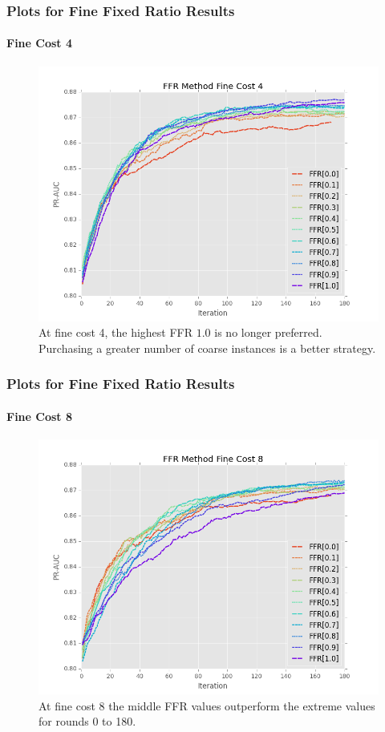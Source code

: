 \documentclass{beamer}
\begin{document}
\begin{frame}
    \frametitle{Plots for Fine Fixed Ratio Results}
    \framesubtitle{Fine Cost 4}
    \begin{figure}[!htb]
        \centering
        \includegraphics[width=0.8\columnwidth]{fig/ParamsFFR_PR_Cost4_rnds0_180}
        \caption{At fine cost 4, the highest FFR $1.0$ is no longer preferred. Purchasing a greater number of coarse instances is a better strategy.}
        \label{fig:ParamsFFR_PR_Cost4_rnds0_180}
    \end{figure}
\end{frame}
\begin{frame}
    \frametitle{Plots for Fine Fixed Ratio Results}
    \framesubtitle{Fine Cost 8}
    \begin{figure}[!htb]
        \centering
        \includegraphics[width=0.8\columnwidth]{fig/ParamsFFR_PR_Cost8_rnds0_180}
        \caption{At fine cost 8 the middle FFR values outperform the extreme values
        for rounds 0 to 180.}
        \label{fig:ParamsFFR_PR_Cost8_rnds0_180}
    \end{figure}
\end{frame}
\end{document}

